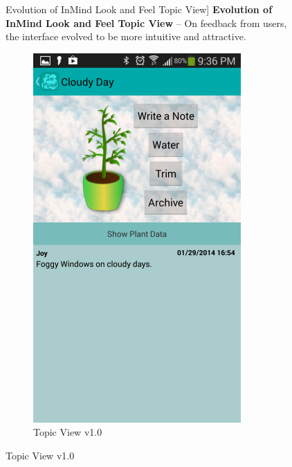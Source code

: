   \begin{figure}
    \caption
    [Evolution of InMind Look and Feel Topic View]
    {\textbf{Evolution of InMind Look and Feel Topic View} --
    On feedback from users, the interface evolved to be more intuitive and attractive.}
    \centering
    \begin{subfigure}[b]{0.4\textwidth}
      \includegraphics[width=\textwidth]{plant_init.png}
       \caption{Topic View v1.0}
    \end{subfigure}

\end{figure}
